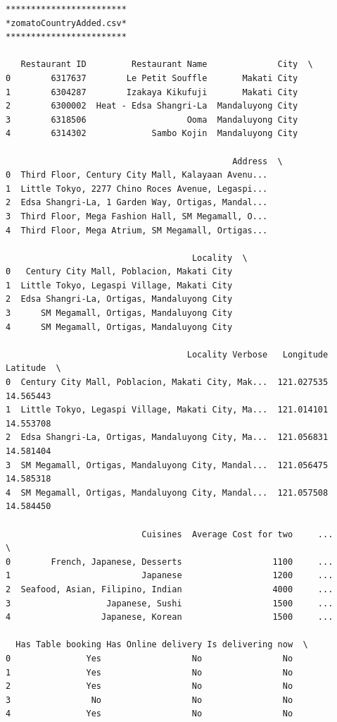 \documentclass[11pt]{article} %
\begin{document}
\begin{lstlisting}
************************
*zomatoCountryAdded.csv*
************************

   Restaurant ID         Restaurant Name              City  \
0        6317637        Le Petit Souffle       Makati City   
1        6304287        Izakaya Kikufuji       Makati City   
2        6300002  Heat - Edsa Shangri-La  Mandaluyong City   
3        6318506                    Ooma  Mandaluyong City   
4        6314302             Sambo Kojin  Mandaluyong City   

                                             Address  \
0  Third Floor, Century City Mall, Kalayaan Avenu...   
1  Little Tokyo, 2277 Chino Roces Avenue, Legaspi...   
2  Edsa Shangri-La, 1 Garden Way, Ortigas, Mandal...   
3  Third Floor, Mega Fashion Hall, SM Megamall, O...   
4  Third Floor, Mega Atrium, SM Megamall, Ortigas...   

                                     Locality  \
0   Century City Mall, Poblacion, Makati City   
1  Little Tokyo, Legaspi Village, Makati City   
2  Edsa Shangri-La, Ortigas, Mandaluyong City   
3      SM Megamall, Ortigas, Mandaluyong City   
4      SM Megamall, Ortigas, Mandaluyong City   

                                    Locality Verbose   Longitude   Latitude  \
0  Century City Mall, Poblacion, Makati City, Mak...  121.027535  14.565443   
1  Little Tokyo, Legaspi Village, Makati City, Ma...  121.014101  14.553708   
2  Edsa Shangri-La, Ortigas, Mandaluyong City, Ma...  121.056831  14.581404   
3  SM Megamall, Ortigas, Mandaluyong City, Mandal...  121.056475  14.585318   
4  SM Megamall, Ortigas, Mandaluyong City, Mandal...  121.057508  14.584450   

                           Cuisines  Average Cost for two     ...       \
0        French, Japanese, Desserts                  1100     ...        
1                          Japanese                  1200     ...        
2  Seafood, Asian, Filipino, Indian                  4000     ...        
3                   Japanese, Sushi                  1500     ...        
4                  Japanese, Korean                  1500     ...        

  Has Table booking Has Online delivery Is delivering now  \
0               Yes                  No                No   
1               Yes                  No                No   
2               Yes                  No                No   
3                No                  No                No   
4               Yes                  No                No   


\end{lstlisting}
\end{document}
